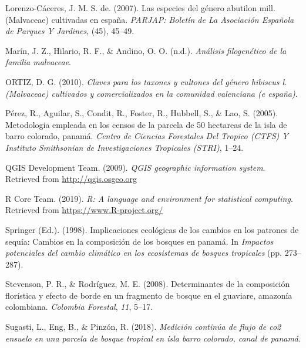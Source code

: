 \documentclass[11pt,]{article}
\begin{document}
\hypertarget{ref-de2007especies}{}
Lorenzo-Cáceres, J. M. S. de. (2007). Las especies del género abutilon
mill.(Malvaceae) cultivadas en españa. \emph{PARJAP: Boletín de La
Asociación Española de Parques Y Jardines}, (45), 45--49.

\hypertarget{ref-marinanalisis}{}
Marín, J. Z., Hilario, R. F., \& Andino, O. O. (n.d.). \emph{Análisis
filogenético de la familia malvaceae}.

\hypertarget{ref-ortizclaves}{}
ORTIZ, D. G. (2010). \emph{Claves para los taxones y cultones del género
hibiscus l.(Malvaceae) cultivados y comercializados en la comunidad
valenciana (e españa)}.

\hypertarget{ref-perez2005metodologia}{}
Pérez, R., Aguilar, S., Condit, R., Foster, R., Hubbell, S., \& Lao, S.
(2005). Metodologia empleada en los censos de la parcela de 50 hectareas
de la isla de barro colorado, panamá. \emph{Centro de Ciencias
Forestales Del Tropico (CTFS) Y Instituto Smithsonian de Investigaciones
Tropicales (STRI)}, 1--24.

\hypertarget{ref-QGIS_software}{}
QGIS Development Team. (2009). \emph{QGIS geographic information
system}. Retrieved from \url{http://qgis.osgeo.org}

\hypertarget{ref-R}{}
R Core Team. (2019). \emph{R: A language and environment for statistical
computing}. Retrieved from \url{https://www.R-project.org/}

\hypertarget{ref-condit1998ecological}{}
Springer (Ed.). (1998). Implicaciones ecológicas de los cambios en los
patrones de sequía: Cambios en la composición de los bosques en panamá.
In \emph{Impactos potenciales del cambio climático en los ecosistemas de
bosques tropicales} (pp. 273--287).

\hypertarget{ref-stevenson2008determinantes}{}
Stevenson, P. R., \& Rodríguez, M. E. (2008). Determinantes de la
composición florística y efecto de borde en un fragmento de bosque en el
guaviare, amazonía colombiana. \emph{Colombia Forestal}, \emph{11},
5--17.

\hypertarget{ref-sugastimedicion}{}
Sugasti, L., Eng, B., \& Pinzón, R. (2018). \emph{Medición continúa de
flujo de co2 ensuelo en una parcela de bosque tropical en isla barro
colorado, canal de panamá.}




\newpage
\singlespacing 
\end{document}
